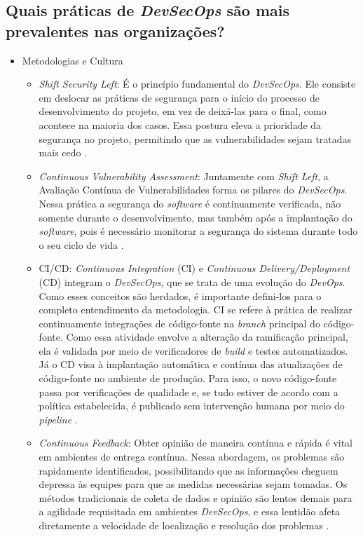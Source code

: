 \subsection{Quais práticas de \textit{DevSecOps} são mais prevalentes nas organizações?}
\begin{itemize}
    \item Metodologias e Cultura
    \begin{itemize}
        \item \textit{Shift Security Left}: É o princípio fundamental do \textit{DevSecOps}. Ele consiste em deslocar as práticas de segurança para o início do processo de desenvolvimento do projeto, em vez de deixá-las para o final, como acontece na maioria dos casos. Essa postura eleva a prioridade da segurança no projeto, permitindo que as vulnerabilidades sejam tratadas mais cedo \cite{Rajapakse2022}.
        \item \textit{Continuous Vulnerability Assessment}: Juntamente com \textit{Shift Left}, a Avaliação Contínua de Vulnerabilidades forma os pilares do \textit{DevSecOps}. Nessa prática a segurança do \textit{software} é continuamente verificada, não somente durante o desenvolvimento, mas também após a implantação do \textit{software}, pois é necessário monitorar a segurança do sistema durante todo o seu ciclo de vida \cite{Rajapakse2022}.
        \item CI/CD: \textit{Continuous Integration} (CI) e \textit{Continuous Delivery/Deployment} (CD) integram o \textit{DevSecOps}, que se trata de uma evolução do \textit{DevOps}. Como esses conceitos são herdados, é importante defini-los para o completo entendimento da metodologia. CI se refere à prática de realizar continuamente integrações de código-fonte na \textit{branch} principal do código-fonte. Como essa atividade envolve a alteração da ramificação principal, ela é validada por meio de verificadores de \textit{build} e testes automatizados. Já o CD visa à implantação automática e contínua das atualizações de código-fonte no ambiente de produção. Para isso, o novo código-fonte passa por verificações de qualidade e, se tudo estiver de acordo com a política estabelecida, é publicado sem intervenção humana por meio do \textit{pipeline} \cite{Rajapakse2022}.
        \item \textit{Continuous Feedback}: Obter opinião de maneira contínua e rápida é vital em ambientes de entrega contínua. Nessa abordagem, os problemas são rapidamente identificados, possibilitando que as informações cheguem depressa às equipes para que as medidas necessárias sejam tomadas. Os métodos tradicionais de coleta de dados e opinião são lentos demais para a agilidade requisitada em ambientes \textit{DevSecOps}, e essa lentidão afeta diretamente a velocidade de localização e resolução dos problemas \cite{Rajapakse2022}.

\end{itemize}
\end{itemize}
